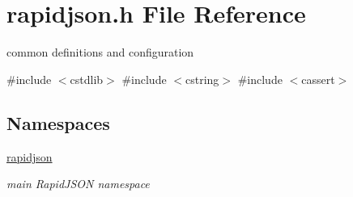 \hypertarget{a00560}{}\section{rapidjson.\+h File Reference}
\label{a00560}


common definitions and configuration  


{\ttfamily \#include $<$cstdlib$>$}\newline
{\ttfamily \#include $<$cstring$>$}\newline
{\ttfamily \#include $<$cassert$>$}\newline
\subsection*{Namespaces}
\begin{DoxyCompactItemize}
\item 
 \hyperlink{a00653}{rapidjson}
\begin{DoxyCompactList}\small\item\em main Rapid\+J\+S\+ON namespace \end{DoxyCompactList}\end{DoxyCompactItemize}
